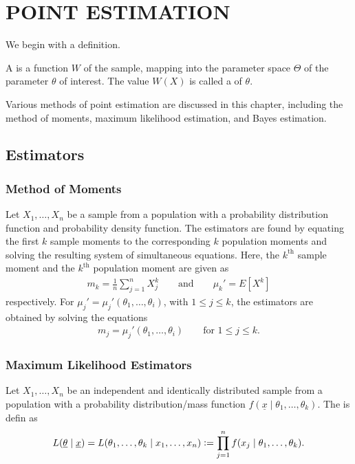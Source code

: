\chapter{POINT ESTIMATION}

We begin with a definition.

\begin{definition}
    A  is a function $W$ of the sample, mapping into the parameter space $\Theta$ of the parameter $\theta$ of interest. The value $W(X)$ is called a  of $\theta$.
\end{definition}

Various methods of point estimation are discussed in this chapter, including the method of moments, maximum likelihood estimation, and Bayes estimation.

\section{Estimators}
\subsection{Method of Moments}
Let $X_{1},\ldots,X_{n}$ be a sample from a population with a probability distribution function and probability density function. The  estimators are found by equating the first $k$ sample moments to the corresponding $k$ population moments and solving the resulting system of simultaneous equations. Here, the $k^{\text{th}}$ sample moment and the $k^{\text{th}}$ population moment are given as
\begin{align}
    m_{k} = \frac{1}{n} \sum_{j=1}^{n} X_{j}^{k} \qquad \text{and} \qquad \mu_{k}' = E[X^{k}]
\end{align}
respectively. For $\mu_{j}' = \mu_{j}'(\theta_{1},\ldots,\theta_{i})$, with $1 \leq j \leq k$, the estimators are obtained by solving the equations
\begin{align}
    m_{j} = \mu_{j}'(\theta_{1},\ldots,\theta_{i}) \qquad \text{for } 1 \leq j \leq k.
\end{align}

\subsection{Maximum Likelihood Estimators}

Let $X_{1},\ldots,X_{n}$ be an independent and identically distributed sample from a population with a probability distribution/mass function $f(\underline{x} \mid \theta_{1},\ldots,\theta_{k})$. The  is defin as
\begin{align}
    L(\underline{\theta} \mid \underline{x}) = L(\theta_{1},\ldots,\theta_{k} \mid x_{1},\ldots,x_{n}) \vcentcolon= \prod_{j=1}^{n} f(x_{j} \mid \theta_{1},\ldots,\theta_{k}).
\end{align}

